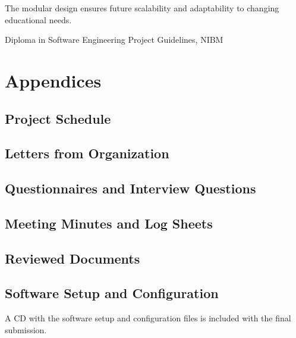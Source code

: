\documentclass[12pt,a4paper]{report}
\begin{document}
The modular design ensures future scalability and adaptability to changing educational needs.

\newpage
\begin{thebibliography}{9}
     Diploma in Software Engineering Project Guidelines, NIBM
\end{thebibliography}

\appendix
\chapter{Appendices}
\section{Project Schedule}

\section{Letters from Organization}

\section{Questionnaires and Interview Questions}

\section{Meeting Minutes and Log Sheets}

\section{Reviewed Documents}

\section{Software Setup and Configuration}
A CD with the software setup and configuration files is included with the final submission.
\end{document}
